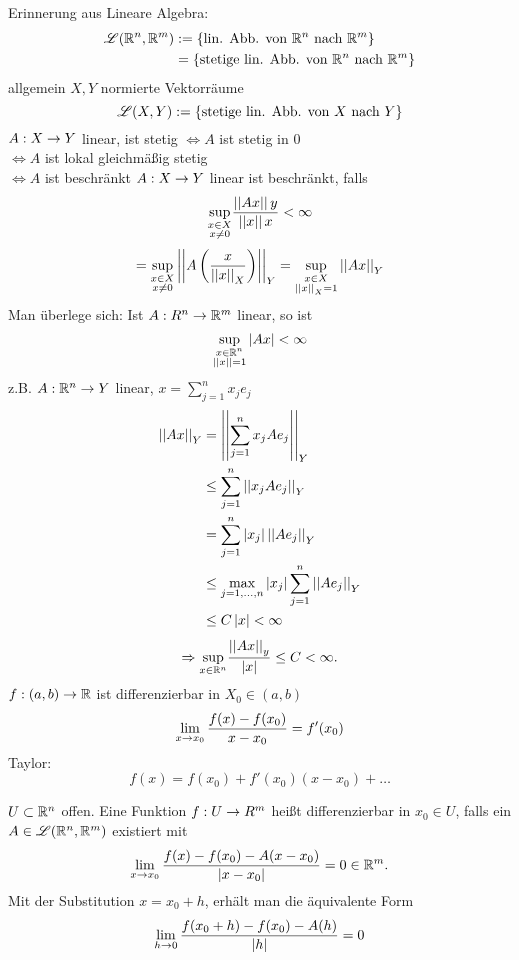 \documentclass[../ana2.tex]{subfiles}
\begin{document}
Erinnerung aus Lineare Algebra:
\begin{align*}
    \mathscr{L}(\mathbb{R}^n, \mathbb{R}^m) 
    &:= \{\text{lin. Abb. von } \mathbb{R}^n \text{ nach } \mathbb{R}^m\}\\
    &= \{\text{stetige lin. Abb. von } \mathbb{R}^n \text{ nach } \mathbb{R}^m\}
\end{align*}
allgemein \( X, Y \) normierte Vektorräume
\[ \mathscr{L}(X, Y) := 
\{\text{stetige lin. Abb. von } X \text{ nach } Y\}  \]
\( A:X\rightarrow Y \) linear, ist stetig 
\( \Leftrightarrow A \) ist stetig in \(0\) \\
\( \Leftrightarrow A \) ist lokal gleichmäßig stetig \\
\( \Leftrightarrow A \) ist beschränkt
\( A:X\rightarrow Y \) linear ist beschränkt, falls 
\[ \underset{\substack{x\in X\\x \neq 0}}{\sup}
\frac{ \left|\left|Ax\right|\right|y }{\left|\left|x\right|\right|x} < \infty \]
\[ = \underset{\substack{x\in X\\x \neq 0}}{\sup} 
\left|\left| A\left(\frac{x}{\left|\left|x\right|\right|_X}\right) \right|\right|_Y
= \underset{\substack{x\in X\\\left|\left|x\right|\right|_X = 1}}{\sup} 
\left|\left|Ax\right|\right|_Y \]
Man überlege sich: Ist \( A:R^n\rightarrow \mathbb{R}^m \)
linear, so ist
\[ \underset{\substack{x\in \mathbb{R}^n \\ \left|\left|x\right|\right| = 1}}{\sup} \left|Ax\right| < \infty \]
z.B. \( A:\mathbb{R}^n\rightarrow Y \) linear, \(x = \sum_{j=1}^n x_j e_j\)
\begin{align*}
    \left|\left|Ax\right|\right|_Y &= \left|\left|\sum_{j=1}^n x_jAe_j\right|\right|_Y \\
    &\leq \sum_{j=1}^n \left|\left| x_j A e_j \right|\right|_Y \\
    &= \sum_{j=1}^n \left|x_j\right| \left|\left| A e_j \right|\right|_Y \\
    &\leq \underset{j=1,\ldots,n}{\max} \left|x_j\right| \sum_{j=1}^n \left|\left|A e_j\right|\right|_Y\\
    &\leq C \left|x\right| < \infty
\end{align*}
\[ \Rightarrow \underset{x\in\mathbb{R}^n}{\sup} 
\frac{ \left|\left|A x\right|\right|_y }{\left|x\right|} \leq C < \infty. \]
\( f:(a,b)\rightarrow \mathbb{R} \) ist differenzierbar in \( X_0 \in (a,b)\)
\[ \lim\limits_{x\rightarrow{}x_0} \frac{f(x)-f(x_0)}{x-x_0} = f'(x_0) \]
Taylor: \[ f(x) = f(x_0) + f'(x_0)(x - x_0) + \ldots \]
\begin{defi}[Ableitung]
    \( U \subset \mathbb{R}^n \) offen. Eine Funktion \(f:U\rightarrow R^m\)
    heißt differenzierbar in \(x_0 \in U\), falls ein
    \( A \in \mathscr{L}(\mathbb{R}^n, \mathbb{R}^m) \) existiert mit
    \[ \lim\limits_{x\rightarrow{}x_0} \frac{f(x) -f(x_0) - A(x-x_0)}{\left|x-x_0\right|} 
    = 0 \in \mathbb{R}^m. \]
    Mit der Substitution \( x = x_0 + h \), 
    erhält man die äquivalente Form 
    \[ \lim\limits_{h\rightarrow{}0} \frac{ f(x_0 + h) - f(x_0) - A(h) }{\left|h\right|} = 0 \]
\end{defi}
\end{document}
